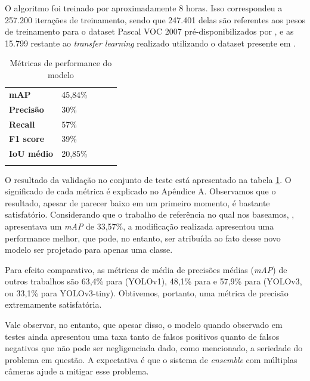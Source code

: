 \documentclass[]{politex}
\begin{document}
O algoritmo foi treinado por aproximadamente 8 horas. Isso correspondeu a 257.200 iterações de treinamento, sendo que 247.401 delas são referentes aos pesos de treinamento para o dataset Pascal VOC 2007 pré-disponibilizados por \citeyear{yololite} \citeauthor{yololite}, e as 15.799 restante ao \textit{transfer learning} realizado utilizando o dataset presente em \citeyear{olmos1} \citeauthor{olmos2}.

\begin{table}[h]
\centering
\begin{tabular}{lllll}
\cline{1-2}
\multicolumn{1}{|l|}{\textbf{mAP}}       & \multicolumn{1}{l|}{45,84\%} &  &  &  \\ \cline{1-2}
\multicolumn{1}{|l|}{\textbf{Precisão}}  & \multicolumn{1}{l|}{30\%}    &  &  &  \\ \cline{1-2}
\multicolumn{1}{|l|}{\textbf{Recall}}    & \multicolumn{1}{l|}{57\%}    &  &  &  \\ \cline{1-2}
\multicolumn{1}{|l|}{\textbf{F1 score}}  & \multicolumn{1}{l|}{39\%}    &  &  &  \\ \cline{1-2}
\multicolumn{1}{|l|}{\textbf{IoU médio}} & \multicolumn{1}{l|}{20,85\%} &  &  &  \\ \cline{1-2}
                                         &                              &  &  & 
\end{tabular}
\caption{Métricas de performance do modelo}
\label{tbl:resultados}
\end{table}

O resultado da validação no conjunto de teste está apresentado na tabela \ref{tbl:resultados}. O significado de cada métrica é explicado no Apêndice A. Observamos que o resultado, apesar de parecer baixo em um primeiro momento, é bastante satisfatório. Considerando que o trabalho de referência no qual nos baseamos, \citeyear{yololite} \citeauthor{yololite}, apresentava um \textit{mAP} de 33,57\%, a modificação realizada apresentou uma performance melhor, que pode, no entanto, ser atribuída ao fato desse novo modelo ser projetado para apenas uma classe.

Para efeito comparativo, as métricas de média de precisões médias (\textit{mAP}) de outros trabalhos são 63,4\% para \citeyear{yolov1} \citeauthor{yolov1} (YOLOv1), 48,1\% para \citeyear{yolo9000} \citeauthor{yolo9000} e 57,9\% para \citeyear{yolov3} \citeauthor{yolov3} (YOLOv3, ou 33,1\% para YOLOv3-tiny). Obtivemos, portanto, uma métrica de precisão extremamente satisfatória.

Vale observar, no entanto, que apesar disso, o modelo quando observado em testes ainda apresentou uma taxa tanto de falsos positivos quanto de falsos negativos que não pode ser negligenciada dado, como mencionado, a seriedade do problema em questão. A expectativa é que o sistema de \textit{ensemble} com múltiplas câmeras ajude a mitigar esse problema.
\end{document}
